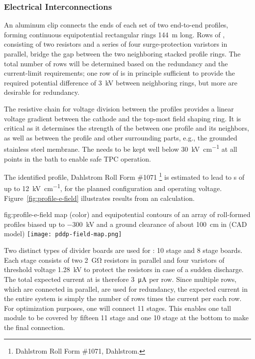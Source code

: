 \subsubsection{Electrical Interconnections}

An aluminum clip connects the ends of each set of two end-to-end  profiles, forming continuous equipotential rectangular rings  \SI{144}{\m} long. 
Rows of , consisting of two resistors and a series of four surge-protection varistors in parallel, bridge the gap between the two neighboring stacked profile rings.   The total number of rows will be determined based on the redundancy and the current-limit requirements;  one row of  is in principle sufficient to provide the required potential difference of \SI{3}{\kV} between neighboring rings, but more are desirable for redundancy.


The resistive chain for voltage division between the profiles provides a linear voltage gradient between the cathode and the top-most field shaping ring. It is critical as it determines the strength of the \efield between one profile and its neighbors, as well as between the profile and other surrounding parts, e.g., the grounded stainless steel membrane. The \efield needs to be kept well below \SI{30}{\kV\per\cm} at all points in the \lar bath to enable safe TPC operation.

The identified profile, Dahlstrom Roll Form \#1071
\footnote{Dahlstrom Roll Form \#1071, Dahlstrom\texttrademark{}.}  is estimated to lead to \efield{}s of up to \SI{12}{\kV\per\cm},   
for the planned  configuration and operating voltage. Figure~\ref{fig:profile-e-field} illustrates results from an \efield calculation.


\begin{dunefigure}
{fig:profile-e-field}
{\efield map (color) and equipotential contours of an array of roll-formed profiles biased up to \SI{-300}{\kV} and a ground clearance of about \SI{100}{\cm} in  (CAD model)} 
\texttt{[image: pddp-field-map.png]}
\end{dunefigure}

Two distinct types of  divider boards are used for : \num{10} stage and \num{8} stage boards.  Each stage consists of two \SI{2}{\giga\ohm} resistors in parallel and four varistors of threshold voltage \SI{1.28}{kV} to protect the resistors in case of a sudden discharge.  The total expected current at \dptargetdriftvoltpos is therefore \SI{3}{\micro\ampere} per row.  Since multiple rows, which are connected in parallel, are used for redundancy, the expected current in the entire system is simply the number of rows times the current per each row.
For optimization purposes, one   will connect \num{11} stages.  This enables  one \tpcheight tall module to be covered by fifteen \num{11} stage  and one \num{10} stage  at the bottom to make the final connection.  


